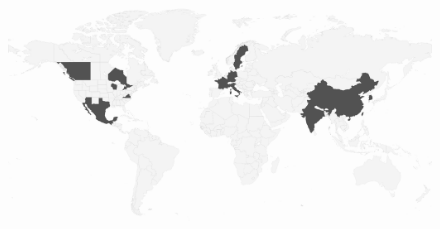 \documentclass[
	openany, %
	parskip=full, %
	12pt, %
	a4paper, %
]{conferencebooklet} %
\begin{document}
\begin{figure}
    \centering
    \includegraphics[width=\linewidth]{images/map.png}
\end{figure}

\newpage
\end{document}
